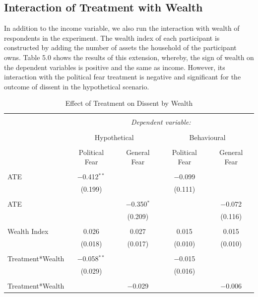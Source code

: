 \documentclass{article}
\begin{document}
\subsection{Interaction of Treatment with Wealth}

In addition to the income variable, we also run the interaction with wealth of respondents in the experiment. The wealth index of each participant is constructed by adding the number of assets the household of the participant owns. Table 5.0 shows the results of this extension, whereby, the sign of wealth on the dependent variables is positive and the same as income. However, its interaction with the political fear treatment is negative and significant for the outcome of dissent in the hypothetical scenario.  


\setlength{\tabcolsep}{0.3pt}
\begin{table}[!htbp] \centering 
  \caption{Effect of Treatment on Dissent by Wealth} 
  \label{} 
\begin{tabular}{@{\extracolsep{5pt}}lcccc} 
\\[-1.8ex]\hline 
\hline \\[-1.8ex] 
 & \multicolumn{4}{c}{\textit{Dependent variable:}} \\ 
\cline{2-5} 
\\[-1.8ex] & \multicolumn{2}{c}{Hypothetical} & \multicolumn{2}{c}{Behavioural} \\ 
\\[-1.8ex] & Political Fear & General Fear & Political Fear & General Fear \\ 
\hline \\[-1.8ex] 
 ATE & $-$0.412$^{**}$ &  & $-$0.099 &  \\ 
  & (0.199) &  & (0.111) &  \\ 
  & & & & \\ 
 ATE &  & $-$0.350$^{*}$ &  & $-$0.072 \\ 
  &  & (0.209) &  & (0.116) \\ 
  & & & & \\ 
 Wealth Index & 0.026 & 0.027 & 0.015 & 0.015 \\ 
  & (0.018) & (0.017) & (0.010) & (0.010) \\ 
  & & & & \\ 
 Treatment*Wealth & $-$0.058$^{**}$ &  & $-$0.015 &  \\ 
  & (0.029) &  & (0.016) &  \\ 
  & & & & \\ 
 Treatment*Wealth &  & $-$0.029 &  & $-$0.006 \\ 

\end{tabular}
\end{table}
\end{document}

